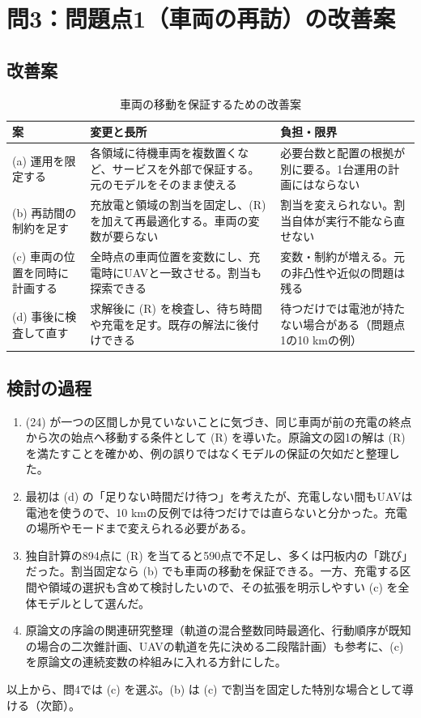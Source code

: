 \documentclass[uplatex,dvipdfmx,a4paper,11pt,jafont=haranoaji]{bxjsarticle}
\newcommand{\answerpart}[1]{\par\Needspace{6\baselineskip}\subsection*{#1}}
\begin{document}
\FloatBarrier
\section{問3：問題点1（車両の再訪）の改善案}

\answerpart{改善案}
\begin{table}[H]
  \centering
  \caption{車両の移動を保証するための改善案}
  \label{tab:options}
  \begin{tabular}{p{}p{}p{}}
    \toprule
    案 & 変更と長所 & 負担・限界 \\
    \midrule
    (a) 運用を限定する & 各領域に待機車両を複数置くなど、サービスを外部で保証する。元のモデルをそのまま使える & 必要台数と配置の根拠が別に要る。1台運用の計画にはならない \\
    (b) 再訪間の制約を足す & 充放電と領域の割当を固定し、(R) を加えて再最適化する。車両の変数が要らない & 割当を変えられない。割当自体が実行不能なら直せない \\
    (c) 車両の位置を同時に計画する & 全時点の車両位置を変数にし、充電時にUAVと一致させる。割当も探索できる & 変数・制約が増える。元の非凸性や近似の問題は残る \\
    (d) 事後に検査して直す & 求解後に (R) を検査し、待ち時間や充電を足す。既存の解法に後付けできる & 待つだけでは電池が持たない場合がある（問題点1の10 kmの例） \\
    \bottomrule
  \end{tabular}
\end{table}

\answerpart{検討の過程}
\begin{enumerate}
  \item (24) が一つの区間しか見ていないことに気づき、同じ車両が前の充電の終点から次の始点へ移動する条件として (R) を導いた。原論文の図1の解は (R) を満たすことを確かめ、例の誤りではなくモデルの保証の欠如だと整理した。
  \item 最初は (d) の「足りない時間だけ待つ」を考えたが、充電しない間もUAVは電池を使うので、10 kmの反例では待つだけでは直らないと分かった。充電の場所やモードまで変えられる必要がある。
  \item 独自計算の894点に (R) を当てると590点で不足し、多くは円板内の「跳び」だった。割当固定なら (b) でも車両の移動を保証できる。一方、充電する区間や領域の選択も含めて検討したいので、その拡張を明示しやすい (c) を全体モデルとして選んだ。
  \item 原論文の序論の関連研究整理\cite{yuan}（軌道の混合整数同時最適化、行動順序が既知の場合の二次錐計画、UAVの軌道を先に決める二段階計画）も参考に、(c) を原論文の連続変数の枠組みに入れる方針にした。
\end{enumerate}
以上から、問4では (c) を選ぶ。(b) は (c) で割当を固定した特別な場合として導ける（次節）。
\end{document}
